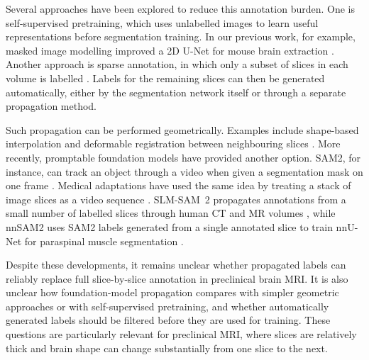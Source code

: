 \documentclass{article}
\begin{document}
Several approaches have been explored to reduce this annotation burden. One is self-supervised pretraining, which uses unlabelled images to learn useful representations before segmentation training. In our previous work, for example, masked image modelling improved a 2D U-Net for mouse brain extraction \cite{ali2025ssl}. Another approach is sparse annotation, in which only a subset of slices in each volume is labelled \cite{cicek2016unet3d}. Labels for the remaining slices can then be generated automatically, either by the segmentation network itself or through a separate propagation method.

Such propagation can be performed geometrically. Examples include shape-based interpolation \cite{raya1990shape} and deformable registration between neighbouring slices \cite{balakrishnan2019voxelmorph}. More recently, promptable foundation models have provided another option. SAM2, for instance, can track an object through a video when given a segmentation mask on one frame \cite{ravi2024sam2}. Medical adaptations have used the same idea by treating a stack of image slices as a video sequence \cite{ma2024medsam, zhu2024medicalsam2}. SLM-SAM~2 propagates annotations from a small number of labelled slices through human CT and MR volumes \cite{chen2025slmsam2}, while nnSAM2 uses SAM2 labels generated from a single annotated slice to train nnU-Net for paraspinal muscle segmentation \cite{zhang2025nnsam2}.

Despite these developments, it remains unclear whether propagated labels can reliably replace full slice-by-slice annotation in preclinical brain MRI. It is also unclear how foundation-model propagation compares with simpler geometric approaches or with self-supervised pretraining, and whether automatically generated labels should be filtered before they are used for training. These questions are particularly relevant for preclinical MRI, where slices are relatively thick and brain shape can change substantially from one slice to the next.
\end{document}

